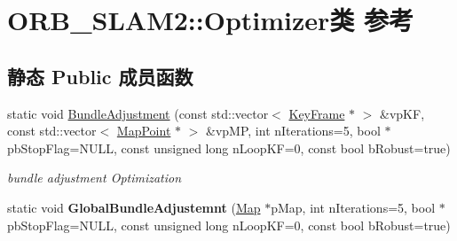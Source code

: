 \hypertarget{classORB__SLAM2_1_1Optimizer}{\section{O\-R\-B\-\_\-\-S\-L\-A\-M2\-:\-:Optimizer类 参考}
\label{classORB__SLAM2_1_1Optimizer}
}
\subsection*{静态 Public 成员函数}
\begin{DoxyCompactItemize}
\item 
static void \hyperlink{classORB__SLAM2_1_1Optimizer_a5e855fe6b54082739b7e7013048e6340}{Bundle\-Adjustment} (const std\-::vector$<$ \hyperlink{classORB__SLAM2_1_1KeyFrame}{Key\-Frame} $\ast$ $>$ \&vp\-K\-F, const std\-::vector$<$ \hyperlink{classORB__SLAM2_1_1MapPoint}{Map\-Point} $\ast$ $>$ \&vp\-M\-P, int n\-Iterations=5, bool $\ast$pb\-Stop\-Flag=N\-U\-L\-L, const unsigned long n\-Loop\-K\-F=0, const bool b\-Robust=true)
\begin{DoxyCompactList}\small\item\em bundle adjustment Optimization \end{DoxyCompactList}\item 
\hypertarget{classORB__SLAM2_1_1Optimizer_aaa9b8a4c16296bf2981b0aaf4ee3189c}{static void {\bfseries Global\-Bundle\-Adjustemnt} (\hyperlink{classORB__SLAM2_1_1Map}{Map} $\ast$p\-Map, int n\-Iterations=5, bool $\ast$pb\-Stop\-Flag=N\-U\-L\-L, const unsigned long n\-Loop\-K\-F=0, const bool b\-Robust=true)}\label{classORB__SLAM2_1_1Optimizer_aaa9b8a4c16296bf2981b0aaf4ee3189c}


\end{DoxyCompactItemize}
